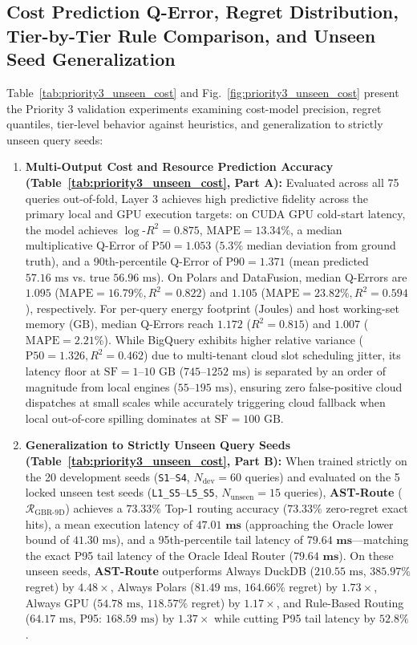\documentclass[10pt,a4paper]{article}
\begin{document}
\subsection{Cost Prediction Q-Error, Regret Distribution, Tier-by-Tier Rule Comparison, and Unseen Seed Generalization}
Table~\ref{tab:priority3_unseen_cost} and Fig.~\ref{fig:priority3_unseen_cost} present the Priority 3 validation experiments examining cost-model precision, regret quantiles, tier-level behavior against heuristics, and generalization to strictly unseen query seeds:
\begin{enumerate}[leftmargin=1.5em,itemsep=2pt]
    \item \textbf{Multi-Output Cost and Resource Prediction Accuracy (Table~\ref{tab:priority3_unseen_cost}, Part A):} Evaluated across all 75 queries out-of-fold, Layer 3 achieves high predictive fidelity across the primary local and GPU execution targets: on CUDA GPU cold-start latency, the model achieves $\log\text{-}R^2 = \mathbf{0.875}$, $\text{MAPE} = \mathbf{13.34\%}$, a median multiplicative Q-Error of $\text{P50} = \mathbf{1.053}$ ($5.3\%$ median deviation from ground truth), and a 90th-percentile Q-Error of $\text{P90} = \mathbf{1.371}$ (mean predicted $57.16\text{ ms}$ vs. true $56.96\text{ ms}$). On Polars and DataFusion, median Q-Errors are $\mathbf{1.095}$ ($\text{MAPE}=16.79\%, R^2=0.822$) and $\mathbf{1.105}$ ($\text{MAPE}=23.82\%, R^2=0.594$), respectively. For per-query energy footprint ($\text{Joules}$) and host working-set memory ($\text{GB}$), median Q-Errors reach $\mathbf{1.172}$ ($R^2=0.815$) and $\mathbf{1.007}$ ($\text{MAPE}=2.21\%$). While BigQuery exhibits higher relative variance ($\text{P50}=1.326, R^2=0.462$) due to multi-tenant cloud slot scheduling jitter, its latency floor at $\text{SF}=1\text{--}10\text{ GB}$ ($745\text{--}1252\text{ ms}$) is separated by an order of magnitude from local engines ($55\text{--}195\text{ ms}$), ensuring zero false-positive cloud dispatches at small scales while accurately triggering cloud fallback when local out-of-core spilling dominates at $\text{SF}=100\text{ GB}$.
    \item \textbf{Generalization to Strictly Unseen Query Seeds (Table~\ref{tab:priority3_unseen_cost}, Part B):} When trained strictly on the 20 development seeds (\texttt{S1}--\texttt{S4}, $N_{\text{dev}}=60$ queries) and evaluated on the 5 locked unseen test seeds (\texttt{L1\_S5}--\texttt{L5\_S5}, $N_{\text{unseen}}=15$ queries), \textbf{AST-Route} ($\mathcal{R}_{\text{GBR-9D}}$) achieves a $\mathbf{73.33\%}$ Top-1 routing accuracy ($\mathbf{73.33\%}$ zero-regret exact hits), a mean execution latency of $\mathbf{47.01\text{ ms}}$ (approaching the Oracle lower bound of $41.30\text{ ms}$), and a 95th-percentile tail latency of $\mathbf{79.64\text{ ms}}$---matching the exact P95 tail latency of the Oracle Ideal Router ($\mathbf{79.64\text{ ms}}$). On these unseen seeds, \textbf{AST-Route} outperforms Always DuckDB ($210.55\text{ ms}$, $385.97\%$ regret) by $\mathbf{4.48\times}$, Always Polars ($81.49\text{ ms}$, $164.66\%$ regret) by $\mathbf{1.73\times}$, Always GPU ($54.78\text{ ms}$, $118.57\%$ regret) by $\mathbf{1.17\times}$, and Rule-Based Routing ($64.17\text{ ms}$, P95: $168.59\text{ ms}$) by $\mathbf{1.37\times}$ while cutting P95 tail latency by $\mathbf{52.8\%}$.

\end{enumerate}
\end{document}
